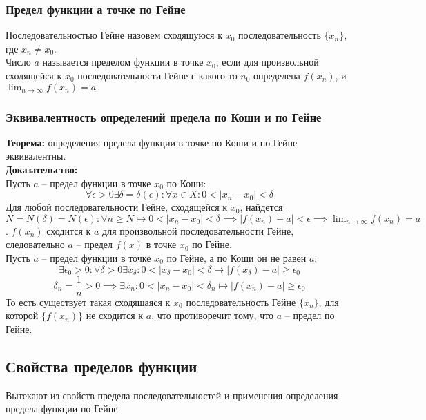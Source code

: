 \documentclass{article}
\begin{document}
    \subsubsection*{Предел функции а точке по Гейне}
        Последовательностью Гейне назовем сходящуюся к $x_0$ последовательность $\{x_n\}$, где $x_n \neq x_0$.
        \\
        Число $a$ называется пределом функции в точке $x_0$, если для произвольной сходящейся к $x_0$ последовательности Гейне с какого-то $n_0$ определена $f(x_n)$,
        и $\lim_{n \to \infty} f(x_n) = a$
    
    \subsubsection*{Эквивалентность определений предела по Коши и по Гейне}
        \textbf{Теорема:} определения предела функции в точке по Коши и по Гейне эквивалентны.
        \\
        \textbf{Доказательство:}
        \\
        Пусть $a$ -- предел функции в точке $x_0$ по Коши:
        \[ \forall \epsilon > 0 \exists \delta = \delta(\epsilon): \forall x \in X: 0 < |x_n - x_0| < \delta \]
        Для любой последовательности Гейне, сходящейся к $x_0$, найдется $N = N(\delta) = N(\epsilon): 
        \forall n \ge N \longmapsto 0 < |x_n - x_0| < \delta \implies |f(x_n) - a| < \epsilon \implies \lim_{n \to \infty} f(x_n) = a$. $f(x_n)$ сходится к $a$ для произвольной последовательности
        Гейне, следовательно $a$ -- предел $f(x)$ в точке $x_0$ по Гейне.
        \\
        Пусть $a$ -- предел функции в точке $x_0$ по Гейне, а по Коши он не равен $a$:
        \[ \exists \epsilon_0 > 0: \forall \delta > 0 \exists x_\delta: 0 < |x_\delta - x_0| < \delta \longmapsto |f(x_\delta) - a| \ge \epsilon_0 \]
        \[\delta_n = \frac{1}{n} > 0 \implies \exists x_n: 0 < |x_n - x_0| < \delta_n \longmapsto |f(x_n) - a| \ge \epsilon_0 \]
        То есть существует такая сходящаяся к $x_0$ последовательность Гейне $\{x_n\}$, для которой $\{f(x_n)\}$ не сходится к $a$, что противоречит тому, что $a$ -- предел по Гейне.  
    
    \subsection*{Свойства пределов функции}
        Вытекают из свойств предела последовательностей и применения определения предела функции по Гейне.
    
\end{document}
